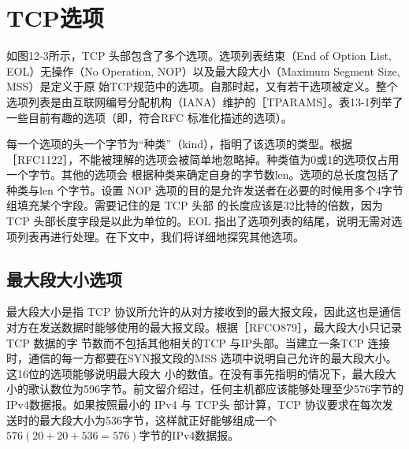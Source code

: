 \section{TCP选项} \label{tcpOpt}
如图12-3所示，TCP 头部包含了多个选项。选项列表结束（End of Option List, EOL）无操作（No Operation, NOP）以及最大段大小（Maximum Segment Size, MSS）是定义于原
始TCP规范中的选项。自那时起，又有若干选项被定义。整个选项列表是由互联网编号分配机构（IANA）维护的［TPARAMS］。表13-1列举了一些目前有趣的选项（即，符合RFC
标准化描述的选项）。

每一个选项的头一个字节为“种类”（kind），指明了该选项的类型。根据［RFC1122］，不能被理解的选项会被简单地忽略掉。种类值为0或1的选项仅占用一个字节。其他的选项会
根据种类来确定自身的字节数len。选项的总长度包括了种类与len 个字节。设置 NOP 选项的目的是允许发送者在必要的时候用多个4字节组填充某个字段。需要记住的是 TCP 头部
的长度应该是32比特的倍数，因为TCP 头部长度字段是以此为单位的。EOL 指出了选项列表的结尾，说明无需对选项列表再进行处理。在下文中，我们将详细地探究其他选项。

\subsection{最大段大小选项}
最大段大小是指 TCP 协议所允许的从对方接收到的最大报文段，因此这也是通信对方在发送数据时能够使用的最大报文段。根据［RFCO879］，最大段大小只记录 TCP 数据的字
节数而不包括其他相关的TCP 与IP头部。当建立一条TCP 连接时，通信的每一方都要在SYN报文段的MSS 选项中说明自己允许的最大段大小。这16位的选项能够说明最大段大
小的数值。在没有事先指明的情况下，最大段大小的歌认数位为596字节。前文留介绍过，任何主机都应该能够处理至少576字节的IPv4数据报。如果按照最小的 IPv4 与 TCP头
部计算，TCP 协议要求在每次发送时的最大段大小为536字节，这样就正好能够组成一个$576(20+20+536= 576)$字节的IPv4数据报。

